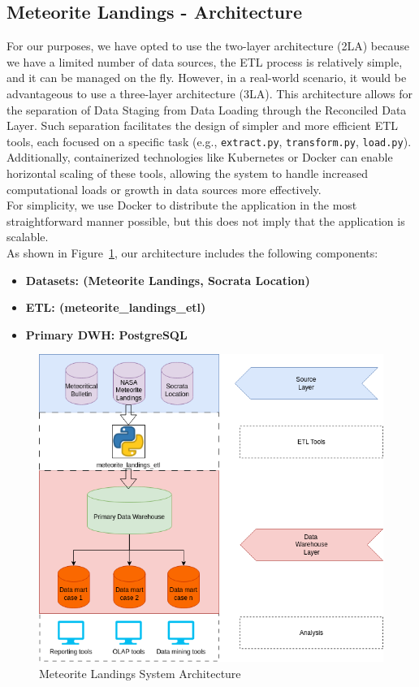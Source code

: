 \documentclass[conference]{IEEEtran}
\begin{document}
	\subsection{Meteorite Landings - Architecture}
	For our purposes, we have opted to use the two-layer architecture (2LA) because we have a limited number of data sources, the ETL process is relatively simple, and it can be managed on the fly. However, in a real-world scenario, it would be advantageous to use a three-layer architecture (3LA). This architecture allows for the separation of Data Staging from Data Loading through the Reconciled Data Layer. Such separation facilitates the design of simpler and more efficient ETL tools, each focused on a specific task (e.g., \texttt{extract.py}, \texttt{transform.py}, \texttt{load.py}). Additionally, containerized technologies like Kubernetes or Docker can enable horizontal scaling of these tools, allowing the system to handle increased computational loads or growth in data sources more effectively.\\For simplicity, we use Docker to distribute the application in the most straightforward manner possible, but this does not imply that the application is scalable.\\As shown in Figure~\ref{fig:Meteorite Landings System Architecture}, our architecture includes the following components:
	\begin{itemize}
		\item \textbf{Datasets: (Meteorite Landings, Socrata Location)}
		\item \textbf{ETL: (meteorite\_landings\_etl)}
		\item \textbf{Primary DWH: PostgreSQL}  
	\end{itemize}
	\begin{figure}[htpb]
		\centering
		\includegraphics[width=\columnwidth]{images/system_architecture.png}
		\caption{Meteorite Landings System Architecture}
		\label{fig:Meteorite Landings System Architecture}
	\end{figure}
	
\end{document}
